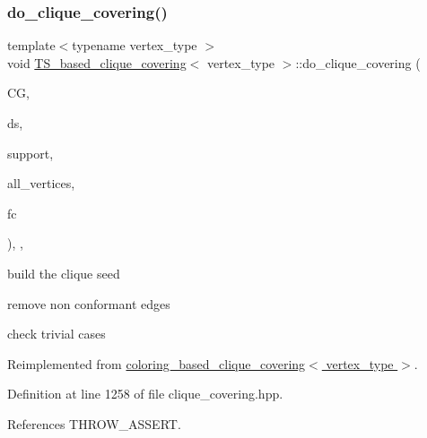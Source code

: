 \subsubsection{\texorpdfstring{do\+\_\+clique\+\_\+covering()}{do\_clique\_covering()}}
{\footnotesize\ttfamily template$<$typename vertex\+\_\+type $>$ \\
void \hyperlink{classTS__based__clique__covering}{T\+S\+\_\+based\+\_\+clique\+\_\+covering}$<$ vertex\+\_\+type $>$\+::do\+\_\+clique\+\_\+covering (\begin{DoxyParamCaption}\item[{const \hyperlink{clique__covering__graph_8hpp_ac7a90ca8b64cfc536aaf17bc81186c18}{cc\+\_\+compatibility\+\_\+graph\+Ref}}]{CG,  }\item[{typename boost\+::disjoint\+\_\+sets$<$ \hyperlink{clique__covering__graph_8hpp_af170aff46b9e4328f1ad9b119cf78b4a}{rank\+\_\+pmap\+\_\+type}, \hyperlink{clique__covering__graph_8hpp_af4c454ac367cfb12e29c98e6bc942a06}{pred\+\_\+pmap\+\_\+type} $>$ \&}]{ds,  }\item[{\hyperlink{classCustomUnorderedSet}{Custom\+Unordered\+Set}$<$ \hyperlink{clique__covering__graph_8hpp_a9cb45047ea8c5ed95a8cfa90494345aa}{C\+\_\+vertex} $>$ \&}]{support,  }\item[{const \hyperlink{classCustomUnorderedSet}{Custom\+Unordered\+Set}$<$ \hyperlink{clique__covering__graph_8hpp_a9cb45047ea8c5ed95a8cfa90494345aa}{C\+\_\+vertex} $>$ \&}]{all\+\_\+vertices,  }\item[{const \hyperlink{structfilter__clique}{filter\+\_\+clique}$<$ vertex\+\_\+type $>$ \&}]{fc }\end{DoxyParamCaption})\hspace{0.3cm}{\ttfamily [inline]}, {\ttfamily [override]}, {\ttfamily [virtual]}}

build the clique seed

remove non conformant edges

check trivial cases 

Reimplemented from \hyperlink{classcoloring__based__clique__covering_ab6db4b8e878397afcd5378715d438046}{coloring\+\_\+based\+\_\+clique\+\_\+covering$<$ vertex\+\_\+type $>$}.



Definition at line 1258 of file clique\+\_\+covering.\+hpp.



References T\+H\+R\+O\+W\+\_\+\+A\+S\+S\+E\+RT.

\mbox{\label{classTS__based__clique__covering_a5a3e99dae13279b217976fba856fb30d}} 
